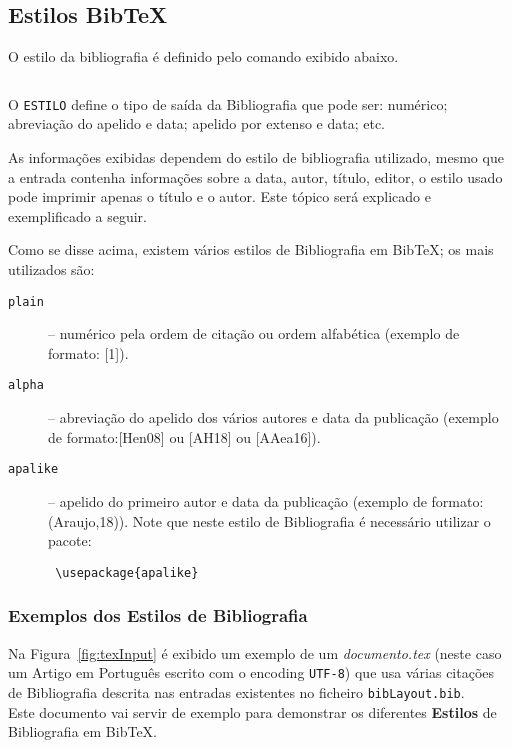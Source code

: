 \documentclass{article}%
\begin{document}
\subsection{Estilos Bib\TeX}
O estilo da bibliografia é definido pelo comando exibido abaixo.

\begin{verbatim}\end{verbatim}

O \texttt{ESTILO} define o tipo de saída da Bibliografia que pode ser:
numérico; abreviação do apelido e data; apelido por extenso e data; etc.

As informações exibidas dependem do estilo de bibliografia utilizado, mesmo que a entrada contenha informações sobre a data,
autor, título, editor, o estilo usado pode imprimir apenas o título e o autor.
Este tópico será explicado e exemplificado a seguir.

Como se disse acima, existem vários estilos de Bibliografia em Bib\TeX; os mais utilizados são:

\begin{description}
  \item[\texttt{plain}] -- numérico pela ordem de citação ou ordem alfabética (exemplo de formato: [1]).

  \item[\texttt{alpha}] -- abreviação do apelido dos vários autores e data da publicação (exemplo de formato:[Hen08] ou [AH18]
  ou [AAea16]).

  \item[\texttt{apalike}] --  apelido do primeiro autor e data da publicação (exemplo de formato: (Araujo,18)).
  Note que neste estilo de Bibliografia é necessário utilizar o pacote:
 \begin{verbatim} \usepackage{apalike}\end{verbatim}
\end{description}

\subsubsection{Exemplos dos Estilos de Bibliografia}
Na Figura~\ref{fig:texInput} é exibido um exemplo de um \emph{documento.tex} (neste caso um Artigo em Português
escrito com o encoding \texttt{UTF-8}) que usa várias citações de  Bibliografia descrita nas entradas existentes
no ficheiro \texttt{bibLayout.bib}.\\
Este documento vai servir de exemplo para demonstrar os diferentes \textbf{Estilos} de  Bibliografia em Bib\TeX.
\end{document}
